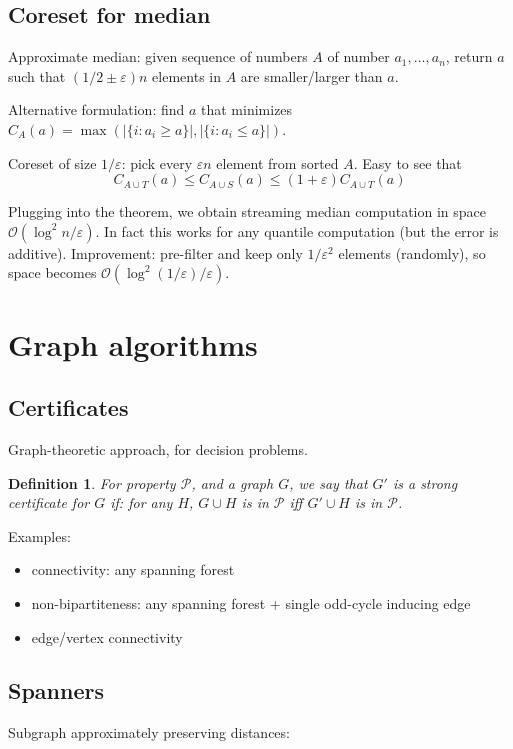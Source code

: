 \documentclass[11pt]{article}
\newtheorem{definition}[theorem]{Definition}
\newcommand{\bigo}{\mathcal{O}}
\begin{document}
\subsection{Coreset for median}
Approximate median: given sequence of numbers $A$ of number $a_1,\ldots,a_n$, return $a$ such that $(1/2 \pm \varepsilon)n$ elements in $A$ are smaller/larger than $a$.

Alternative formulation: find $a$ that minimizes $C_A(a) = \max( |\{i : a_i \ge a\}|, |\{i : a_i \le a\}| )$.

Coreset of size $1/\varepsilon$: pick every $\varepsilon n$ element from sorted $A$.
Easy to see that
$$C_{A \cup T}(a) \le C_{A \cup S}(a) \le (1+\varepsilon) C_{A \cup T}(a)$$

Plugging into the theorem, we obtain streaming median computation in space $\bigo(\log^2 n / \varepsilon)$. In fact this works for any quantile computation (but the error is additive). Improvement: pre-filter and keep only $1/\varepsilon^2$ elements (randomly), so space becomes $\bigo(\log^2 (1/\varepsilon) / \varepsilon)$.

\section{Graph algorithms}
\subsection{Certificates}
Graph-theoretic approach, for decision problems.

\begin{definition}
For property $\mathcal{P}$, and a graph $G$, we say that $G'$ is a strong certificate for $G$ if: for any $H$, $G\cup H$ is in $\mathcal{P}$ iff $G' \cup H$ is in $\mathcal{P}$.
\end{definition}

Examples:
\begin{itemize}
\item connectivity: any spanning forest
\item non-bipartiteness: any spanning forest + single odd-cycle inducing edge
\item edge/vertex connectivity
\end{itemize}

\subsection{Spanners}

Subgraph approximately preserving distances:
\end{document}

